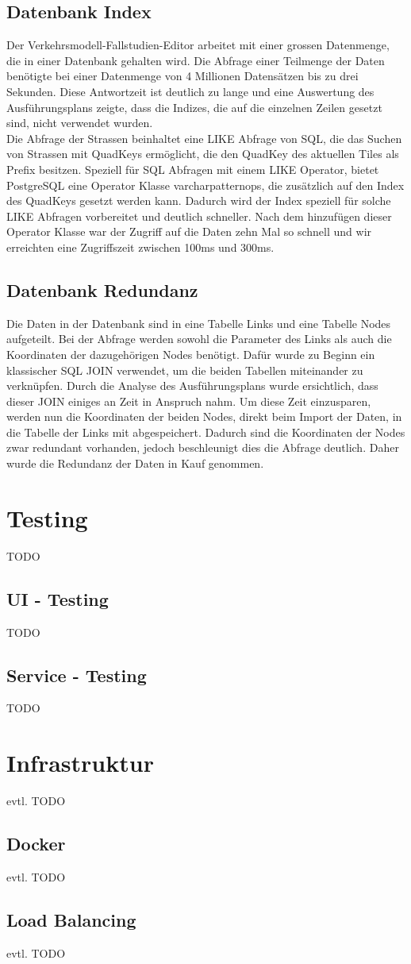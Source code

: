 \subsection{Datenbank Index}
Der Verkehrsmodell-Fallstudien-Editor arbeitet mit einer grossen Datenmenge, die in einer Datenbank gehalten wird. Die Abfrage einer Teilmenge der Daten benötigte bei einer Datenmenge von 4 Millionen Datensätzen bis zu drei Sekunden. Diese Antwortzeit ist deutlich zu lange und eine Auswertung des Ausführungsplans zeigte, dass die Indizes, die auf die einzelnen Zeilen gesetzt sind, nicht verwendet wurden.\\
Die Abfrage der Strassen beinhaltet eine LIKE Abfrage von SQL, die das Suchen von Strassen mit QuadKeys ermöglicht, die den QuadKey des aktuellen Tiles als Prefix besitzen. Speziell für SQL Abfragen mit einem LIKE Operator, bietet PostgreSQL eine Operator Klasse \glqq{}varchar\textunderscore pattern\textunderscore ops\grqq{}, die zusätzlich auf den Index des QuadKeys gesetzt werden kann. Dadurch wird der Index speziell für solche LIKE Abfragen vorbereitet und deutlich schneller. Nach dem hinzufügen dieser Operator Klasse war der Zugriff auf die Daten zehn Mal so schnell und wir erreichten eine Zugriffszeit zwischen 100ms und 300ms.
\subsection{Datenbank Redundanz} \label{ch:redundance}
Die Daten in der Datenbank sind in eine Tabelle \glqq{}Links\grqq{} und eine Tabelle \glqq{}Nodes\grqq{} aufgeteilt. Bei der Abfrage werden sowohl die Parameter des Links als auch die Koordinaten der dazugehörigen Nodes benötigt. Dafür wurde zu Beginn ein klassischer SQL JOIN verwendet, um die beiden Tabellen miteinander zu verknüpfen. Durch die Analyse des Ausführungsplans wurde ersichtlich, dass dieser JOIN einiges an Zeit in Anspruch nahm. Um diese Zeit einzusparen, werden nun die Koordinaten der beiden Nodes, direkt beim Import der Daten, in die Tabelle der Links mit abgespeichert. Dadurch sind die Koordinaten der Nodes zwar redundant vorhanden, jedoch beschleunigt dies die Abfrage deutlich. Daher wurde die Redundanz der Daten in Kauf genommen.
\newpage
\section{Testing}
TODO
\subsection{UI - Testing}
TODO
\subsection{Service - Testing}
TODO
\section{Infrastruktur}
evtl. TODO
\subsection{Docker}
evtl. TODO
\subsection{Load Balancing}
evtl. TODO